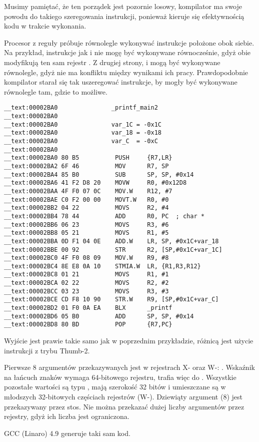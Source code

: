 Musimy pamiętać, że ten porządek jest pozornie losowy, kompilator ma swoje powodu do takiego szeregowania instrukcji, ponieważ kieruje się efektywnością kodu w trakcie wykonania.

Procesor z reguły próbuje równolegle wykonywać instrukcje położone obok siebie. Na przykład, instrukcje jak  i
 nie mogę być wykonywane równocześnie, gdyż obie modyfikują ten sam rejestr .
Z drugiej strony,  i 
mogą być wykonywane równolegle, gdyż nie ma konfliktu między wynikami ich pracy.
Prawdopodobnie kompilator starał się tak uszeregować instrukcje, by mogły być wykonywane równolegle tam, gdzie to możliwe.
 
\myparagraph{\OptimizingXcodeIV: \ThumbTwoMode}

\begin{lstlisting}[style=customasmARM]
__text:00002BA0               _printf_main2
__text:00002BA0
__text:00002BA0               var_1C = -0x1C
__text:00002BA0               var_18 = -0x18
__text:00002BA0               var_C  = -0xC
__text:00002BA0
__text:00002BA0 80 B5          PUSH     {R7,LR}
__text:00002BA2 6F 46          MOV      R7, SP
__text:00002BA4 85 B0          SUB      SP, SP, #0x14
__text:00002BA6 41 F2 D8 20    MOVW     R0, #0x12D8
__text:00002BAA 4F F0 07 0C    MOV.W    R12, #7
__text:00002BAE C0 F2 00 00    MOVT.W   R0, #0
__text:00002BB2 04 22          MOVS     R2, #4
__text:00002BB4 78 44          ADD      R0, PC  ; char *
__text:00002BB6 06 23          MOVS     R3, #6
__text:00002BB8 05 21          MOVS     R1, #5
__text:00002BBA 0D F1 04 0E    ADD.W    LR, SP, #0x1C+var_18
__text:00002BBE 00 92          STR      R2, [SP,#0x1C+var_1C]
__text:00002BC0 4F F0 08 09    MOV.W    R9, #8
__text:00002BC4 8E E8 0A 10    STMIA.W  LR, {R1,R3,R12}
__text:00002BC8 01 21          MOVS     R1, #1
__text:00002BCA 02 22          MOVS     R2, #2
__text:00002BCC 03 23          MOVS     R3, #3
__text:00002BCE CD F8 10 90    STR.W    R9, [SP,#0x1C+var_C]
__text:00002BD2 01 F0 0A EA    BLX      _printf
__text:00002BD6 05 B0          ADD      SP, SP, #0x14
__text:00002BD8 80 BD          POP      {R7,PC}
\end{lstlisting}

Wyjście jest prawie takie samo jak w poprzednim przykładzie, różnicą jest użycie instrukcji z trybu Thumb-2.





Pierwsze 8 argumentów przekazywanych jest w rejestrach X- oraz W-: \ARMPCS.
Wskaźnik na łańcuch znaków wymaga 64-bitowego rejestru, trafia więc do .
Wszystkie pozostałe wartości są typu \Tint, mają szerokość 32 bitów i umieszczane są w młodszych 32-bitowych częściach rejestrów (W-).
Dziewiąty argument (8) jest przekazywany przez stos.
Nie można przekazać dużej liczby argumentów przez rejestry, gdyż ich liczba jest ograniczona.

\Optimizing GCC (Linaro) 4.9 generuje taki sam kod.
